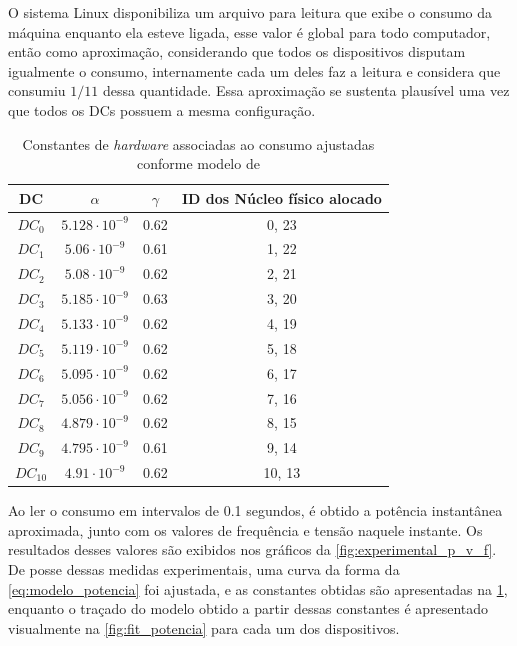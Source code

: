 O sistema Linux disponibiliza um arquivo para leitura que exibe o consumo da máquina enquanto ela esteve ligada, esse valor é global para todo computador, então como aproximação, considerando que todos os dispositivos disputam igualmente o consumo, internamente cada um deles faz a leitura e considera que consumiu $1/11$ dessa quantidade. Essa aproximação se sustenta plausível uma vez que todos os DCs possuem a mesma configuração.  

\begin{table}[H]
        \centering
        \begin{tabular}{c|c|c|c}
        DC         & $\alpha$ & $\gamma$ & ID dos Núcleo físico alocado \\\hline
            
        $ DC_0 $ &  $5.128\cdot 10^{-9} $   &       0.62         & 0, 23 \\
        $ DC_1$  &  $5.06\cdot 10^{-9}  $   &       0.61         & 1, 22 \\
        $ DC_2$  &  $5.08\cdot 10^{-9}  $   &       0.62         & 2, 21 \\
        $ DC_3 $ &  $5.185\cdot 10^{-9} $   &       0.63         & 3, 20 \\
        $ DC_4  $&  $5.133\cdot 10^{-9} $   &       0.62         & 4, 19 \\
        $ DC_5 $ & $ 5.119\cdot 10^{-9}$    &       0.62         & 5, 18 \\
        $ DC_6 $ & $ 5.095\cdot 10^{-9}$    &       0.62         & 6, 17 \\
        $ DC_7 $  & $ 5.056\cdot 10^{-9}$    &       0.62         & 7, 16 \\
        $ DC_8  $& $ 4.879\cdot 10^{-9}$    &       0.62         & 8, 15 \\
        $ DC_9 $  &  $4.795\cdot 10^{-9} $   &       0.61         & 9, 14 \\
        $ DC_{10}$  & $4.91\cdot 10^{-9} $    &       0.62         & 10, 13 \\
        \hline
        \end{tabular}
        \caption{ Constantes de \textit{hardware} associadas ao consumo ajustadas conforme modelo de }
        \label{tab:valores_constantes_fit}
    \end{table}

Ao ler o consumo em intervalos de 0.1 segundos, é obtido a potência instantânea aproximada, junto com os valores de frequência e tensão naquele instante. Os resultados desses valores são exibidos nos gráficos da \cref{fig:experimental_p_v_f}. De posse dessas medidas experimentais, uma curva da forma da \cref{eq:modelo_potencia} foi ajustada, e as constantes obtidas são apresentadas na \cref{tab:valores_constantes_fit}, enquanto o traçado do modelo obtido a partir dessas constantes é apresentado visualmente na \cref{fig:fit_potencia} para cada um dos dispositivos. 

